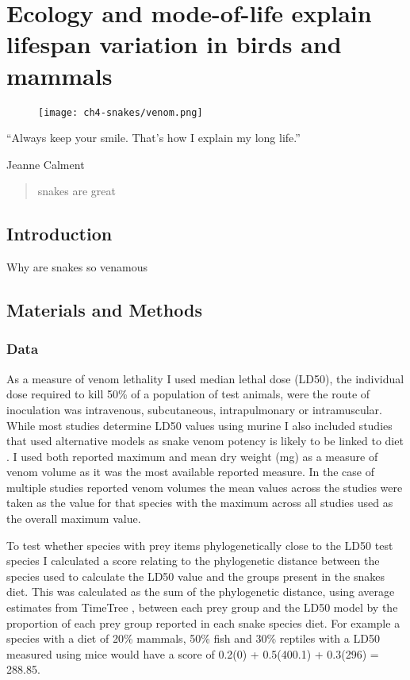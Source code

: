 \chapter[Snake]{Ecology and mode-of-life explain lifespan variation in birds and mammals}
\label{chap:Snake}



\begin{figure}[h]
  \centering
  \texttt{[image: ch4-snakes/venom.png]}
\end{figure}


\begin{quoteshrink}
  ``Always keep your smile. That's how I explain my long life.''
  
\hfill{Jeanne Calment}
\end{quoteshrink}

\begin{abstract}

snakes are great
\end{abstract}

\section{Introduction}

Why are snakes so venamous


\section{Materials and Methods}
\subsection{Data}

As a measure of venom lethality I used median lethal dose (LD50), the individual dose required to kill 50\% of a population of test animals, were the route of inoculation was intravenous, subcutaneous, intrapulmonary or intramuscular. While most studies determine LD50 values using murine I also included studies that used alternative models as snake venom potency is likely to be linked to diet \citep{barlow2009coevolution}. I used both reported maximum and mean dry weight (mg) as a measure of venom volume as it was the most available reported measure. In the case of multiple studies reported venom volumes the mean values across the studies were taken as the value for that species with the maximum across all studies used as the overall maximum value. 


To test whether species with prey items phylogenetically close to the LD50 test species I calculated a score relating to the phylogenetic distance between the species used to calculate the LD50 value and the groups present in the snakes diet. This was calculated as the sum of the phylogenetic distance, using average estimates from TimeTree \citep{hedges2006timetree}, between each prey group and the LD50 model by the proportion of each prey group reported in each snake species diet. For example a species with a diet of 20\% mammals, 50\% fish and 30\% reptiles with a LD50 measured using mice would have a score of 0.2\*(0) + 0.5\*(400.1) + 0.3\*(296) = 288.85.



